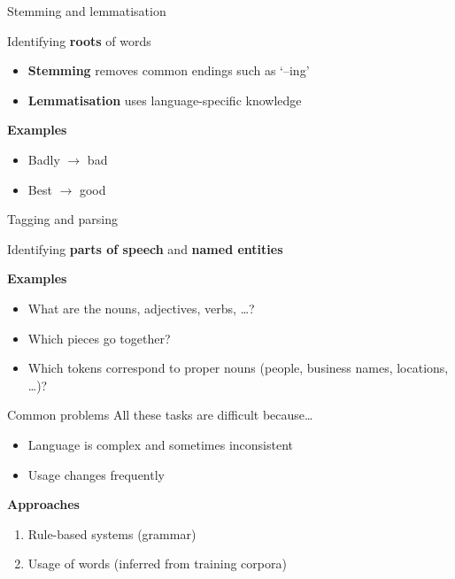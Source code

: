 \begin{frame}{Stemming and lemmatisation}
    \begin{center}
        Identifying \textbf{roots} of words
    \end{center}
    \begin{itemize}
        \item \textbf{Stemming} removes common endings such as `--ing'
        \item \textbf{Lemmatisation} uses language\hyp{}specific knowledge
    \end{itemize}
    \vfill\pause
    \textbf{Examples}
    \begin{itemize}
        \item Badly $\rightarrow$ bad
        \item Best $\rightarrow$ good
    \end{itemize}
\end{frame}

\begin{frame}{Tagging and parsing}
    \begin{center}
        Identifying \textbf{parts of speech} and \textbf{named entities}
    \end{center}
    \vfill\pause
    \textbf{Examples}
    \begin{itemize}
        \item What are the nouns, adjectives, verbs, \ldots?
        \item Which pieces go together?
        \item Which tokens correspond to proper nouns (people, business names,
              locations, \ldots)?
    \end{itemize}
\end{frame}

\begin{frame}{Common problems}
    All these tasks are difficult because\ldots
    \begin{itemize}
        \item Language is complex and sometimes inconsistent
        \item Usage changes frequently
    \end{itemize}
    \vfill\pause
    \textbf{Approaches}
    \begin{enumerate}
        \item Rule\hyp{}based systems (grammar)
        \item Usage of words (inferred from training corpora)
    \end{enumerate}
\end{frame}

